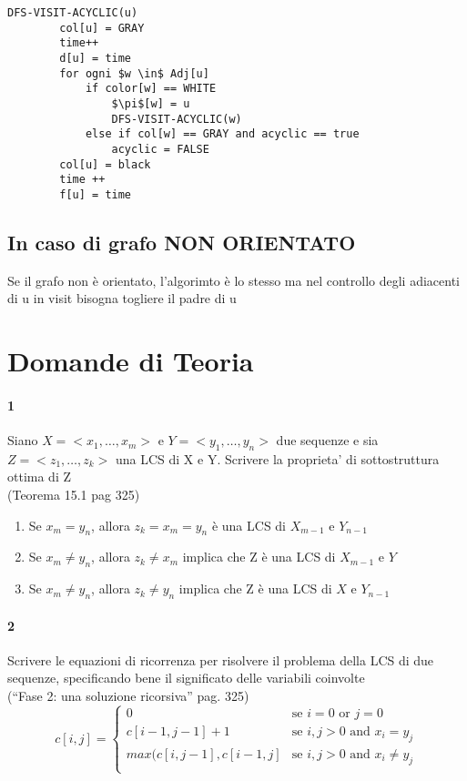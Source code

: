 \documentclass[12pt, a4paper, openany]{book}
\begin{document}
    \begin{lstlisting}[mathescape=true]
    DFS-VISIT-ACYCLIC(u)
        col[u] = GRAY
        time++
        d[u] = time
        for ogni $w \in$ Adj[u]
            if color[w] == WHITE
                $\pi$[w] = u
                DFS-VISIT-ACYCLIC(w)
            else if col[w] == GRAY and acyclic == true
                acyclic = FALSE
        col[u] = black
        time ++
        f[u] = time
    \end{lstlisting}

    \subsection*{In caso di grafo NON ORIENTATO}
    Se il grafo non è orientato, l'algorimto è lo stesso ma nel controllo degli adiacenti di u in visit bisogna togliere il padre di u

    \section{Domande di Teoria}
    \paragraph{1}
    Siano $X=< x_1, …, x_m>$ e $Y=< y_1, …, y_n>$ due sequenze e sia $Z=< z_1, …, z_k>$
    una LCS di X e Y. Scrivere la proprieta’ di sottostruttura ottima di Z \\
    (Teorema 15.1 pag 325)
    \begin{enumerate}
        \item Se $x_m = y_n$, allora $z_k = x_m =y_n$ è  una LCS di $X_{m-1}$ e $Y_{n-1}$
        \item Se $x_m \neq y_n$, allora $z_k \neq x_m$ implica che Z è una LCS di $X_{m-1}$ e $Y$
        \item Se $x_m \neq y_n$, allora $z_k \neq y_n$ implica che Z è una LCS di $X$ e $Y_{n-1}$

    \end{enumerate}
    \paragraph{2}
    Scrivere le equazioni di ricorrenza per risolvere il problema della LCS di due
    sequenze, specificando bene il significato delle variabili coinvolte \\
    (“Fase 2: una soluzione ricorsiva” pag. 325)
    \begin{equation*}
        c[i,j] = \begin{cases}
            0                      & \text{se $i = 0$ or $j = 0$}           \\
            c[i-1,j-1] + 1         & \text{se $i,j > 0$ and $x_i = y_j$}    \\
            max(c[i,j-1], c[i-1,j] & \text{se $i,j > 0$ and $x_i \neq y_j$} \\
        \end{cases}
    \end{equation*}
\end{document}
